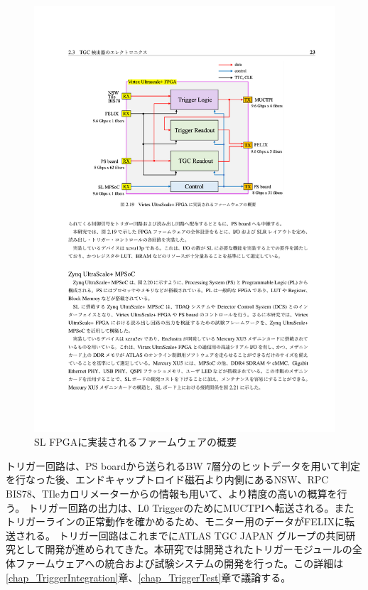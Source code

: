 \begin{figure} 
\centering
\includegraphics[width=16cm]{fig/Intro/SL_FW_overview.pdf}
\caption[SL FPGAに実装されるファームウェアの概要]{SL FPGAに実装されるファームウェアの概要\cite{mt_mishima}}
\label{SL_FW_overview}
\end{figure}

トリガー回路は、PS boardから送られるBW 7層分のヒットデータを用いて\pt 判定を行なった後、エンドキャップトロイド磁石より内側にあるNSW、RPC BIS78、TIleカロリメーターからの情報も用いて、より精度の高い\pt の概算を行う。
トリガー回路の出力は、L0 TriggerのためにMUCTPIへ転送される。またトリガーラインの正常動作を確かめるため、モニター用のデータがFELIXに転送される。
トリガー回路はこれまでにATLAS TGC JAPAN グループの共同研究として開発が進められてきた。本研究では開発されたトリガーモジュールの全体ファームウェアへの統合および試験システムの開発を行った。この詳細は\ref{chap_TriggerIntegration}章、\ref{chap_TriggerTest}章で議論する。

